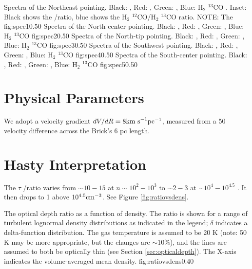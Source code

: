 {Spectra of the Northeast pointing.  Black: \formaldehyde \oneone, Red:
\formaldehyde \twotwo, Green: \ammonia, Blue: H$_2$ $^{13}$CO \oneone.
Inset: Black shows the \oneone/\twotwo ratio, blue shows the H$_2$ $^{12}$CO/H$_2$ $^{13}$CO \oneone ratio.
NOTE: The }
{fig:spec1}{0.5}{0}
{Spectra of the North-center pointing.  Black: \formaldehyde \oneone, Red: \formaldehyde \twotwo, Green: \ammonia, Blue: H$_2$ $^{13}$CO \oneone}
{fig:spec2}{0.5}{0}
{Spectra of the North-tip pointing.  Black: \formaldehyde \oneone, Red: \formaldehyde \twotwo, Green: \ammonia, Blue: H$_2$ $^{13}$CO \oneone}
{fig:spec3}{0.5}{0}
{Spectra of the Southwest pointing.  Black: \formaldehyde \oneone, Red: \formaldehyde \twotwo, Green: \ammonia, Blue: H$_2$ $^{13}$CO \oneone}
{fig:spec4}{0.5}{0}
{Spectra of the South-center pointing.  Black: \formaldehyde \oneone, Red: \formaldehyde \twotwo, Green: \ammonia, Blue: H$_2$ $^{13}$CO \oneone}
{fig:spec5}{0.5}{0}

\section{Physical Parameters}
We adopt a velocity gradient $dV/dR = 8 \textrm{km~s}^{-1} \textrm{pc}^{-1}$, measured from a 50 \kms
velocity difference across the Brick's 6 pc length.

\section{Hasty Interpretation}
\label{sec:interp}
The $\tau$ \oneone/\twotwo ratio varies from $\sim10-15$ at $n\sim10^2-10^3$ \percc to
$\sim2-3$ at $\sim10^4-10^{4.5}$ \percc.  It then drops to 1 above $10^{4.5} \textrm{cm}^{-3}$.
See Figure \ref{fig:ratiovsdens}.

{The optical depth ratio as a function of \hh density.  The ratio is shown for
a range of turbulent lognormal density distributions as indicated in the legend;
$\delta$ indicates a delta-function distribution.
The gas temperature is assumed to be 20 K (note: 50 K may be more appropriate, but the changes
are $\sim10\%$), and the \formaldehyde lines
are assumed to both be optically thin (see Section \ref{sec:opticaldepth}).
The X-axis indicates the volume-averaged mean \hh density. }
{fig:ratiovsdens}{0.4}{0}

